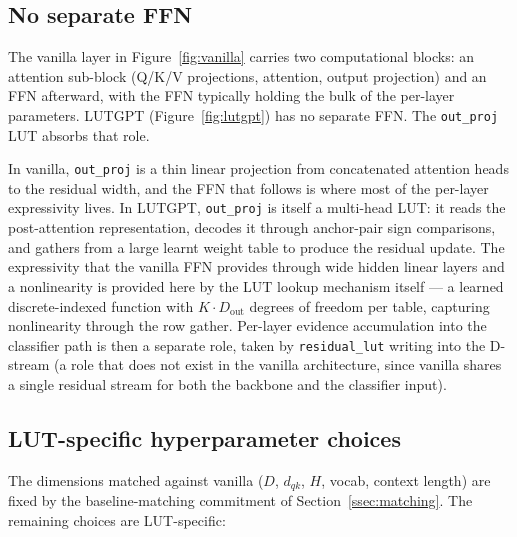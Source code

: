 \documentclass[11pt]{article}
\newcommand{\dqk}{d_{qk}}
\newcommand{\dout}{D_{\mathrm{out}}}
\begin{document}
\subsection{No separate FFN}
\label{ssec:no-ffn}

The vanilla layer in Figure~\ref{fig:vanilla} carries two computational blocks: an attention sub-block (Q/K/V projections, attention, output projection) and an FFN afterward, with the FFN typically holding the bulk of the per-layer parameters. LUTGPT (Figure~\ref{fig:lutgpt}) has no separate FFN. The \texttt{out\_proj} LUT absorbs that role.

In vanilla, \texttt{out\_proj} is a thin linear projection from concatenated attention heads to the residual width, and the FFN that follows is where most of the per-layer expressivity lives. In LUTGPT, \texttt{out\_proj} is itself a multi-head LUT: it reads the post-attention representation, decodes it through anchor-pair sign comparisons, and gathers from a large learnt weight table to produce the residual update. The expressivity that the vanilla FFN provides through wide hidden linear layers and a nonlinearity is provided here by the LUT lookup mechanism itself --- a learned discrete-indexed function with $K \cdot \dout$ degrees of freedom per table, capturing nonlinearity through the row gather. Per-layer evidence accumulation into the classifier path is then a separate role, taken by \texttt{residual\_lut} writing into the D-stream (a role that does not exist in the vanilla architecture, since vanilla shares a single residual stream for both the backbone and the classifier input).

\subsection{LUT-specific hyperparameter choices}
\label{ssec:lutgpt-hyperparams}

The dimensions matched against vanilla ($D$, $\dqk$, $H$, vocab, context length) are fixed by the baseline-matching commitment of Section~\ref{ssec:matching}. The remaining choices are LUT-specific:
\end{document}
